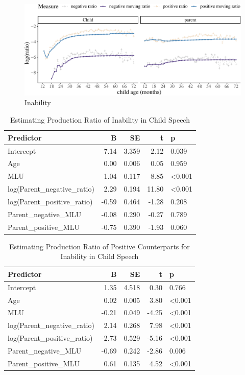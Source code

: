 \documentclass[
  english,
  man,floatsintext]{apa6}
\begin{document}
\begin{figure}[H]

{\centering \includegraphics{results_files/figure-latex/inability-1} 

}

\caption{Inability}\label{fig:inability}
\end{figure}

\begin{table}

\caption{\label{tab:unnamed-chunk-5}Estimating Production Ratio of Inability in Child Speech}
\centering
\begin{tabular}[t]{l|r|r|r|l}
\hline
Predictor & B & SE & t & p\\
\hline
Intercept & 7.14 & 3.359 & 2.12 & 0.039\\
\hline
Age & 0.00 & 0.006 & 0.05 & 0.959\\
\hline
MLU & 1.04 & 0.117 & 8.85 & <0.001\\
\hline
log(Parent\_negative\_ratio) & 2.29 & 0.194 & 11.80 & <0.001\\
\hline
log(Parent\_positive\_ratio) & -0.59 & 0.464 & -1.28 & 0.208\\
\hline
Parent\_negative\_MLU & -0.08 & 0.290 & -0.27 & 0.789\\
\hline
Parent\_positive\_MLU & -0.75 & 0.390 & -1.93 & 0.060\\
\hline
\end{tabular}
\end{table}

\begin{table}

\caption{\label{tab:unnamed-chunk-5}Estimating Production Ratio of Positive Counterparts for Inability in Child Speech}
\centering
\begin{tabular}[t]{l|r|r|r|l}
\hline
Predictor & B & SE & t & p\\
\hline
Intercept & 1.35 & 4.518 & 0.30 & 0.766\\
\hline
Age & 0.02 & 0.005 & 3.80 & <0.001\\
\hline
MLU & -0.21 & 0.049 & -4.25 & <0.001\\
\hline
log(Parent\_negative\_ratio) & 2.14 & 0.268 & 7.98 & <0.001\\
\hline
log(Parent\_positive\_ratio) & -2.73 & 0.529 & -5.16 & <0.001\\
\hline
Parent\_negative\_MLU & -0.69 & 0.242 & -2.86 & 0.006\\
\hline
Parent\_positive\_MLU & 0.61 & 0.135 & 4.52 & <0.001\\
\hline
\end{tabular}
\end{table}
\end{document}
